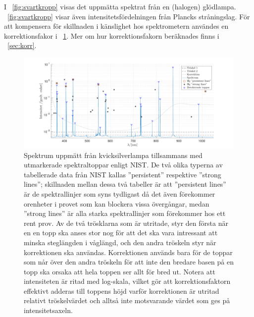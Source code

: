\documentclass[11pt,a4paper]{article}
\newcommand{\figref}{\figurename~\ref}
\begin{document}
I \figref{fig:svartkropp} visas det uppmätta spektrat från en
(halogen) glödlampa. \figref{fig:svartkropp} visar även
intensitetsfördelningen från Plancks stråningslag. För att kompensera
för skillnaden i känslighet hos spektrometern användes en
korrektionsfakor i \figref{fig:Hg_spektrum}. Mer om hur
korrektionsfakorn beräknades finns i \appendixname~\ref{sec:korr}.



\begin{figure}
\centering
\centerline{ %
\includegraphics[width=1.2\textwidth]{Hg_spektrum.pdf}
}
\caption{Spektrum uppmätt från kvicksilverlampa tillsammans med
  utmarkerade spektraltoppar enligt NIST\cite{NIST}. De två olika
  typerna av tabellerade data från NIST kallas ''persistent''
  respektive ''strong lines''; skillnaden mellan dessa två tabeller är
  att ''persistent lines'' är de spektrallinjer som syns tydligast
  då det även förekommer orenheter i provet som kan blockera vissa
  övergångar, medan ''strong lines'' är alla starka spektrallinjer som
  förekommer hos ett rent prov.
  Av de två trösklarna som är utritade, styr den första när en en topp
  ska anses stor nog för att det ska vara intressant att minska
  steglängden i våglängd, och den andra tröskeln styr när korrektionen
  ska användas. Korrektionen används bara för de toppar som når över
  den andra tröskeln för att inte den bredare basen på en topp ska
  orsaka att hela toppen ser allt för bred ut. Notera att intensiteten
  är ritad med log-skala, vilket gör att korrektionsfaktorn effektivt
  adderas till toppens höjd varför korrektionen är utritad relativt
  tröskelvärdet och alltså inte motsvarande värdet som ges på
  intensitetsaxeln. 
}
\label{fig:Hg_spektrum} 
\end{figure}
\end{document}
